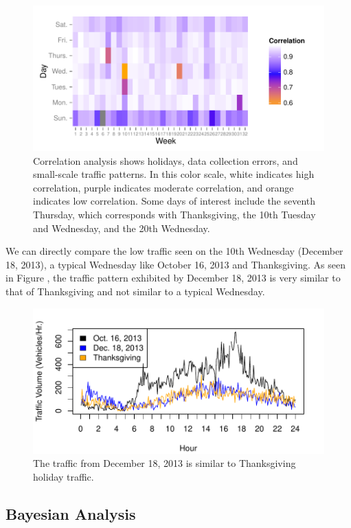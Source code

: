 \documentclass{report}
\begin{document}
\begin{figure}[h]
\centering
\includegraphics{upstat_report-006}
\caption{Correlation analysis shows holidays, data collection errors, and small-scale
traffic patterns. In this color scale, white indicates high correlation, purple
indicates moderate correlation, and orange indicates low correlation. Some days of
interest include the seventh Thursday, which corresponds with Thanksgiving, the
10th Tuesday and Wednesday, and the 20th Wednesday.}
\label{fig:correlation}
\end{figure}

We can directly compare the low traffic seen on the 10th Wednesday
(December 18, 2013), a typical Wednesday like October 16, 2013 and Thanksgiving.
As seen in Figure \label{fig:wednesday}, the traffic pattern exhibited by December
18, 2013 is very similar to that of Thanksgiving and not similar to a typical
Wednesday.

\begin{figure}[h]
\centering
\includegraphics{upstat_report-007}
\caption{The traffic from December 18, 2013 is similar to Thanksgiving holiday traffic.}
\label{fig:wednesday}
\end{figure}

\subsection*{Bayesian Analysis}
\end{document}
